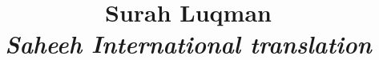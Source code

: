 \documentclass{article}
\title{Surah Luqman \\[12pt] \Large \emph{Saheeh International translation}}
\begin{document}
	\maketitle
	
\begin{ekdosis}
	


\setcolumnwidth{\fill/0.3in}

{\setlength{\parindent}{0pt}
	\parskip=10pt
\begin{alignment}[lcols=2]




\end{alignment}}

\end{ekdosis}
\end{document}
